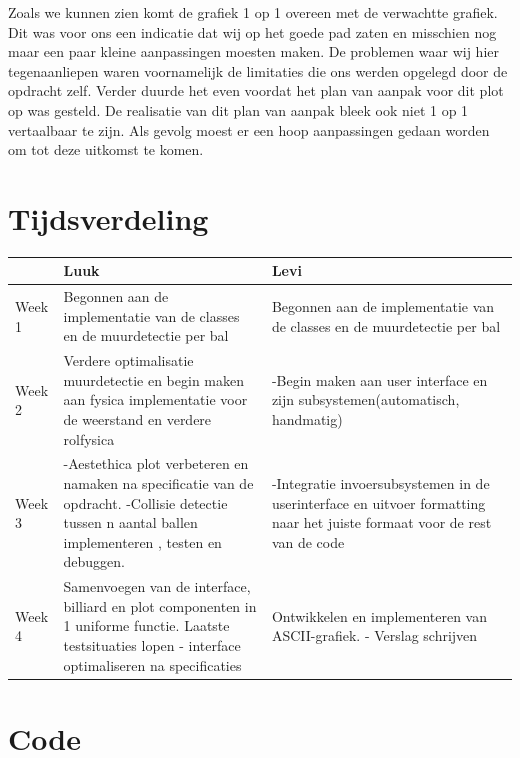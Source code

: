 \documentclass{article}
\begin{document}
Zoals we kunnen zien komt de grafiek 1 op 1 overeen met de verwachtte grafiek.
Dit was voor ons een indicatie dat wij op het goede pad zaten en misschien nog maar een paar kleine aanpassingen moesten maken. De problemen waar wij hier tegenaanliepen waren voornamelijk de limitaties die ons werden opgelegd door de opdracht zelf. Verder duurde het even voordat het plan van aanpak voor dit plot op was gesteld. De realisatie van dit plan van aanpak bleek ook niet 1 op 1 vertaalbaar te zijn. Als gevolg moest er een hoop aanpassingen gedaan worden om tot deze uitkomst te komen.  

\section{Tijdsverdeling}

\begin{tabular}{ l | p{6cm} p{6cm} }
   & Luuk & Levi \\
  \hline
  Week 1 & Begonnen aan de implementatie van de classes en de muurdetectie per bal 
  &  Begonnen aan de implementatie van de classes en de muurdetectie per bal \\
  Week 2 & Verdere optimalisatie muurdetectie en begin maken aan fysica implementatie voor de weerstand en verdere rolfysica 
  & -Begin maken aan user interface en zijn subsystemen(automatisch, handmatig) \\
  Week 3 & -Aestethica plot verbeteren en namaken na specificatie van de opdracht.
  \linebreak -Collisie detectie tussen n aantal ballen implementeren , testen en debuggen.
  & -Integratie invoersubsystemen in de userinterface en uitvoer formatting naar het juiste formaat voor de rest van de code  \\
  Week 4  & Samenvoegen van de interface, billiard en plot componenten in 1 uniforme functie.
  \linebreak Laatste testsituaties lopen \linebreak 
  - interface optimaliseren na specificaties & Ontwikkelen en implementeren van ASCII-grafiek.
  \linebreak - Verslag schrijven   \\
 
 
 
  
\end{tabular}

\section{Code}

 \begin{lstlisting}[frame=single, language=python]
 
 
 
 \end{lstlisting}
\end{document}
